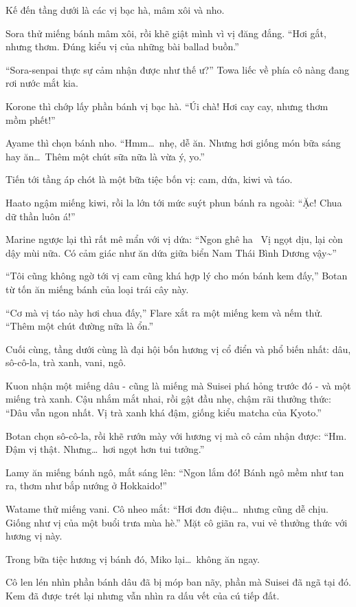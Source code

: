 \documentclass[../main.tex]{subfiles}
\begin{document}
Kế đến tầng dưới là các vị bạc hà, mâm xôi và nho.

Sora thử miếng bánh mâm xôi, rồi khẽ giật mình vì vị đăng đắng. ``Hơi gắt, nhưng thơm. Đúng kiểu vị của những bài ballad buồn.''

``Sora-senpai thực sự cảm nhận được như thế ư?'' Towa liếc về phía cô nàng đang rơi nước mắt kia.

Korone thì chớp lấy phần bánh vị bạc hà. ``Úi chà! Hơi cay cay, nhưng thơm mồm phết!''

Ayame thì chọn bánh nho. ``Hmm\dots\ nhẹ, dễ ăn. Nhưng hơi giống món bữa sáng hay ăn\dots\ Thêm một chút sữa nữa là vừa ý, yo.''

Tiến tới tầng áp chót là một bữa tiệc bốn vị: cam, dứa, kiwi và táo.

Haato ngậm miếng kiwi, rồi la lớn tới mức suýt phun bánh ra ngoài: ``Ặc! Chua dữ thần luôn á!''

Marine ngược lại thì rất mê mẩn với vị dứa: ``Ngon ghê ha~{} Vị ngọt dịu, lại còn dậy mùi nữa. Có cảm giác như ăn dứa giữa biển Nam Thái Bình Dương vậy\~{}''

``Tôi cũng không ngờ tới vị cam cũng khá hợp lý cho món bánh kem đấy,'' Botan từ tốn ăn miếng bánh của loại trái cây này.

``Cơ mà vị táo này hơi chua đấy,'' Flare xắt ra một miếng kem và nếm thử. ``Thêm một chút đường nữa là ổn.''

Cuối cùng, tầng dưới cùng là đại hội bốn hương vị cổ điển và phổ biến nhất: dâu, sô-cô-la, trà xanh, vani, ngô.

Kuon nhận một miếng dâu - cũng là miếng mà Suisei phá hỏng trước đó - và một miếng trà xanh. Cậu nhắm mắt nhai, rồi gật đầu nhẹ, chậm rãi thưởng thức: ``Dâu vẫn ngon nhất. Vị trà xanh khá đậm, giống kiểu matcha của Kyoto.''

Botan chọn sô-cô-la, rồi khẽ rướn mày với hương vị mà cô cảm nhận được: ``Hm. Đậm vị thật. Nhưng\dots\ hơi ngọt hơn tui tưởng.''

Lamy ăn miếng bánh ngô, mắt sáng lên: ``Ngon lắm đó! Bánh ngô mềm như tan ra, thơm như bắp nướng ở Hokkaido!''

Watame thử miếng vani. Cô nheo mắt: ``Hơi đơn điệu\dots\ nhưng cũng dễ chịu. Giống như vị của một buổi trưa mùa hè.'' Mặt cô giãn ra, vui vẻ thưởng thức với hương vị này.

Trong bữa tiệc hương vị bánh đó, Miko lại\dots\ không ăn ngay.

Cô len lén nhìn phần bánh dâu đã bị móp ban nãy, phần mà Suisei đã ngã tại đó. Kem đã được trét lại nhưng vẫn nhìn ra dấu vết của cú tiếp đất.
\end{document}
